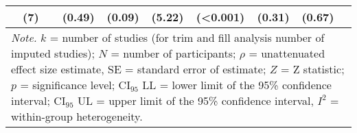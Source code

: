 \begin{table}[ht]
\begin{tabular}{lccccccccc}
   & (7) &  & (0.49) & (0.09) & (5.22) & (<0.001) & (0.31) & (0.67) &  \\ 
   \hline 
 \multicolumn{10}{p{0.95\textwidth}}{\scriptsize{\textit{Note.} $k$ = number of studies (for trim and fill analysis number of imputed studies); $N$ = number of participants; $\rho$ = unattenuated effect size estimate, SE = standard error of estimate; $Z$ = Z statistic; $p$ = significance level; $\textrm{CI}_{95}$ LL = lower limit of the 95\% confidence interval; $\textrm{CI}_{95}$ UL = upper limit of the 95\% confidence interval, $I^2$ = within-group heterogeneity.}} 
\end{tabular}
\endgroup
\end{table}

